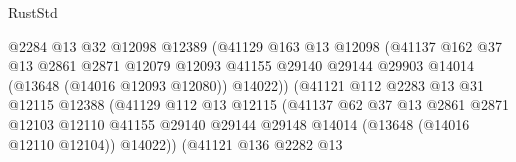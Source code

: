 \begin{lexlean}{RustStd}
\begin{coremodule}
                                      @2284
                                      @13
                                      @32
                                      @12098
                                      @12389
                                      (@41129
                                        @163
                                        @13
                                        @12098
                                        (@41137
                                          @162
                                          @37
                                          @13
                                          @2861
                                          @2871
                                          @12079
                                          @12093
                                          @41155
                                          @29140
                                          @29144
                                          @29903
                                          @14014
                                          (@13648 (@14016 @12093 @12080))
                                          @14022))
                                      (@41121
                                        @112
                                        @2283
                                        @13
                                        @31
                                        @12115
                                        @12388
                                        (@41129
                                          @112
                                          @13
                                          @12115
                                          (@41137
                                            @62
                                            @37
                                            @13
                                            @2861
                                            @2871
                                            @12103
                                            @12110
                                            @41155
                                            @29140
                                            @29144
                                            @29148
                                            @14014
                                            (@13648 (@14016 @12110 @12104))
                                            @14022))
                                        (@41121
                                          @136
                                          @2282
                                          @13

\end{coremodule}
\end{lexlean}
